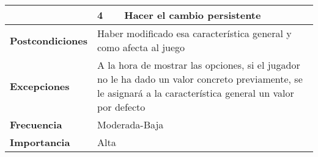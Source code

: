 \begin{longtable}{lll}
\multicolumn{1}{l|}{}                            & 4                                                                    & Hacer el cambio persistente                                                                                 \\ \hline
\textbf{Postcondiciones}                         & \multicolumn{2}{l}{Haber modificado esa característica general y como afecta al juego}                                                                                             \\ \hline
\textbf{Excepciones}                             & \multicolumn{2}{l}{A la hora de mostrar las opciones, si el jugador no le ha dado un valor concreto previamente, se le asignará  a la característica general un valor por defecto} \\ \hline
\textbf{Frecuencia}                              & \multicolumn{2}{l}{Moderada-Baja}                                                                                                                                                  \\ \hline
\textbf{Importancia}                             & \multicolumn{2}{l}{Alta}                                                                                                                                                           \\ \hline
\end{longtable}

